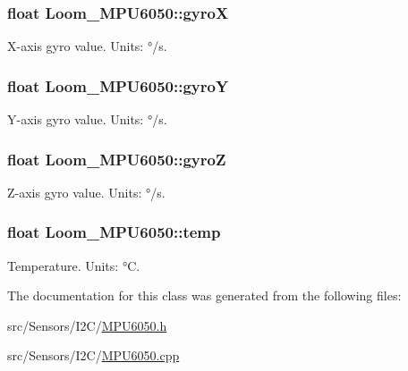 \subsubsection[{\texorpdfstring{gyroX}{gyroX}}]{\setlength{\rightskip}{0pt plus 5cm}float Loom\+\_\+\+M\+P\+U6050\+::gyroX\hspace{0.3cm}{\ttfamily [protected]}}\hypertarget{class_loom___m_p_u6050_afd0b222a584ee71d922532ac12763f9a}{}\label{class_loom___m_p_u6050_afd0b222a584ee71d922532ac12763f9a}


X-\/axis gyro value. Units\+: °/s. 

\subsubsection[{\texorpdfstring{gyroY}{gyroY}}]{\setlength{\rightskip}{0pt plus 5cm}float Loom\+\_\+\+M\+P\+U6050\+::gyroY\hspace{0.3cm}{\ttfamily [protected]}}\hypertarget{class_loom___m_p_u6050_a1edb0ae9dd59317f4c1aafad72f3d5ef}{}\label{class_loom___m_p_u6050_a1edb0ae9dd59317f4c1aafad72f3d5ef}


Y-\/axis gyro value. Units\+: °/s. 

\subsubsection[{\texorpdfstring{gyroZ}{gyroZ}}]{\setlength{\rightskip}{0pt plus 5cm}float Loom\+\_\+\+M\+P\+U6050\+::gyroZ\hspace{0.3cm}{\ttfamily [protected]}}\hypertarget{class_loom___m_p_u6050_a0e8122d20fc6e686e2952e93e1ff1a89}{}\label{class_loom___m_p_u6050_a0e8122d20fc6e686e2952e93e1ff1a89}


Z-\/axis gyro value. Units\+: °/s. 

\subsubsection[{\texorpdfstring{temp}{temp}}]{\setlength{\rightskip}{0pt plus 5cm}float Loom\+\_\+\+M\+P\+U6050\+::temp\hspace{0.3cm}{\ttfamily [protected]}}\hypertarget{class_loom___m_p_u6050_af9c5eb7e6a657f92500dd39df03383b3}{}\label{class_loom___m_p_u6050_af9c5eb7e6a657f92500dd39df03383b3}


Temperature. Units\+: °C. 



The documentation for this class was generated from the following files\+:\begin{DoxyCompactItemize}
\item 
src/\+Sensors/\+I2\+C/\hyperlink{_m_p_u6050_8h}{M\+P\+U6050.\+h}\item 
src/\+Sensors/\+I2\+C/\hyperlink{_m_p_u6050_8cpp}{M\+P\+U6050.\+cpp}\end{DoxyCompactItemize}
